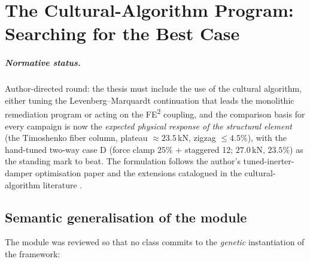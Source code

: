 
\chapter{The Cultural-Algorithm Program: Searching for the Best Case}
\label{ch:cultural-program}

\paragraph{Normative status.}
Author-directed round: the thesis must include the use of the cultural
algorithm, either tuning the Levenberg--Marquardt continuation that
leads the monolithic remediation program or acting on the
FE\textsuperscript{2} coupling, and the comparison basis for every
campaign is now the \emph{expected physical response of the structural
element} (the Timoshenko fiber column, plateau
$\approx 23.5$\,kN, zigzag $\le 4.5\%$), with the hand-tuned two-way
case D (force clamp $25\%$ + staggered 12; $27.0$\,kN, $23.5\%$) as
the standing mark to beat. The formulation follows the author's
tuned-inerter-damper optimisation paper
\cite{LaraValenciaEchavarriaValencia2024} and the extensions
catalogued in the cultural-algorithm literature
\cite{Reynolds1994Cultural,ReynoldsPeng2004,Maheri2021CulturalSurvey}.

\section{Semantic generalisation of the module}
\label{sec:ca-semantics}

The  module was reviewed so that no
class commits to the \emph{genetic} instantiation of the framework:

